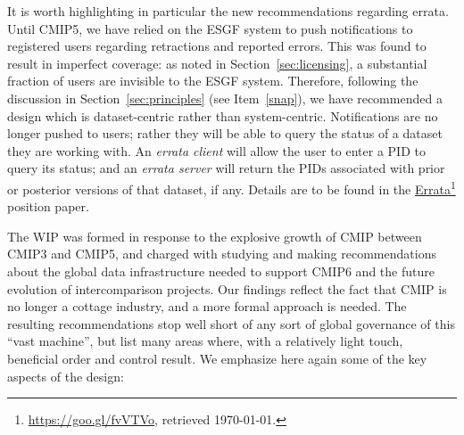 \documentclass[gmd,manuscript]{copernicus}
\newcommand{\urlref}[2] {\href{#1}{#2}\footnote{\url{#1}, retrieved \today.}}
\begin{document}
It is worth highlighting in particular the new recommendations
regarding errata. Until CMIP5, we have relied on the ESGF system to
push notifications to registered users regarding retractions and
reported errors. This was found to result in imperfect coverage: as
noted in Section~\ref{sec:licensing}, a substantial fraction of users are
invisible to the ESGF system. Therefore, following the discussion in
Section~\ref{sec:principles} (see Item~\ref{snap}), we have recommended a
design which is dataset-centric rather than system-centric.
Notifications are no longer pushed to users; rather they will be able
to query the status of a dataset they are working with. An
\emph{errata client} will allow the user to enter a PID to query its
status; and an \emph{errata server} will return the PIDs associated
with prior or posterior versions of that dataset, if any. Details are
to be found in the \urlref{https://goo.gl/fvVTVo}{Errata} position
paper.

\label{sec:summary}

The WIP was formed in response to the explosive growth of CMIP between
CMIP3 and CMIP5, and charged with studying and making recommendations
about the global data infrastructure needed to support CMIP6 and the
future evolution of intercomparison projects. Our findings reflect 
the fact that CMIP is no longer a cottage industry, and a more formal 
approach is needed. The resulting recommendations stop well short of 
any sort of global governance of this ``vast machine'', but list many 
areas where, with a relatively light touch, beneficial order and 
control result. We emphasize here again some of the key aspects of 
the design:
\end{document}
